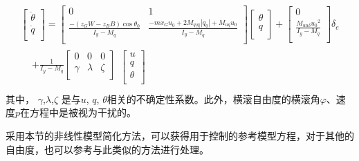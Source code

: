 \begin{equation}
\begin{array}{l}
 \left[ {\begin{array}{*{20}{c}}
   {\dot \theta }  \\
   {\dot q}  \\
\end{array}} \right] = \left[ {\begin{array}{*{20}{c}}
   0 & 1  \\
   {\frac{{ - ({z_G}W - {z_B}B)\cos {\theta _0}}}{{{I_y} - {M_{\dot q}}}}} & {\frac{{ - m{x_G}u_0^{} + 2{M_{q\left| q \right|}}\left| {{q_0}} \right| + {M_{uq}}{u_0}}}{{{I_y} - {M_{\dot q}}}}}  \\
\end{array}} \right]\left[ {\begin{array}{*{20}{c}}
   \theta   \\
   q  \\
\end{array}} \right] + \left[ {\begin{array}{*{20}{c}}
   0  \\
   {\frac{{{M_{uu\delta }}{u_0}^2}}{{{I_y} - {M_{\dot q}}}}}  \\
\end{array}} \right]{\delta _e} \\
 \begin{array}{*{20}{c}}
   {} & { + \frac{1}{{{I_y} - {M_{\dot q}}}}\left[ {\begin{array}{*{20}{c}}
   0 & 0 & 0  \\
   \gamma  & \lambda  & \zeta   \\
\end{array}} \right]}  \\
\end{array}\left[ {\begin{array}{*{20}{c}}
   u  \\
   q  \\
   \theta   \\
\end{array}} \right] \\
 \end{array}
\end{equation}
其中， $\gamma$,$\lambda$,$\zeta$ 是与$u$, $q$, $\theta$相关的不确定性系数。此外，横滚自由度的横滚角$\varphi$、速度$p$在方程中是被视为干扰的。

采用本节的非线性模型简化方法，可以获得用于控制的参考模型方程，对于其他的自由度，也可以参考与此类似的方法进行处理。

